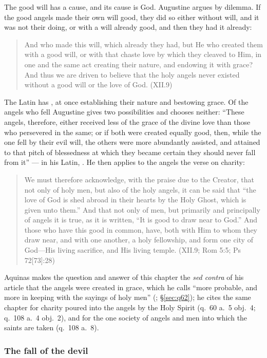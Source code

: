 The good will has a cause, and its cause is God. Augustine argues by
dilemma. If the good angels made their own will good, they did so either
without will, and it was not their doing, or with a will already good,
and then they had it already:
\begin{quote}
And who made this will, which already they had, but He who created them
with a good will, or with that chaste love by which they cleaved to Him,
in one and the same act creating their nature, and endowing it with
grace? And thus we are driven to believe that the holy angels never
existed without a good will or the love of God. (XII.9)
\end{quote}
The Latin has ,
at once establishing their nature and bestowing grace. Of the angels who fell Augustine gives two
possibilities and chooses neither: ``These angels, therefore, either
received less of the grace of the divine love than those who persevered
in the same; or if both were created equally good, then, while the one
fell by their evil will, the others were more abundantly assisted, and
attained to that pitch of blessedness at which they became certain they
should never fall from it'' --- in his Latin, . He then
applies to the angels the verse on charity:
\begin{quote}
We must therefore acknowledge, with the praise due to the Creator, that
not only of holy men, but also of the holy angels, it can be said that
``the love of God is shed abroad in their hearts by the Holy Ghost, which
is given unto them.'' And that not only of men, but primarily and
principally of angels it is true, as it is written, ``It is good to draw
near to God.'' And those who have this good in common, have, both with Him
to whom they draw near, and with one another, a holy fellowship, and form
one city of God---His living sacrifice, and His living temple. (XII.9;
Rom 5:5; Ps 72[73]:28)
\end{quote}
Aquinas makes the question and answer of this chapter the \emph{sed
contra} of his article that the angels were created in grace, which he
calls ``more probable, and more in keeping with the sayings of holy men''
(; \S\ref{sec:q62}); he cites the same chapter for
charity poured into the angels by the Holy Spirit (q.~60 a.~5 obj.~4;
q.~108 a.~4 obj.~2), and for the one society of angels and men into which
the saints are taken (q.~108 a.~8).

\subsubsection{The fall of the devil}\label{sec:aug-fall}

